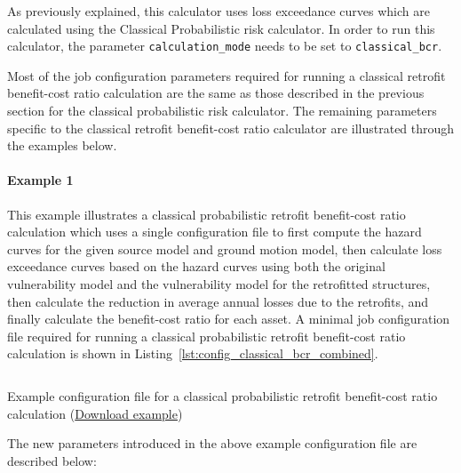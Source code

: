 As previously explained, this calculator uses loss exceedance curves which are
calculated using the Classical Probabilistic risk calculator. In order to run
this calculator, the parameter \Verb+calculation_mode+ needs to be set to
\Verb+classical_bcr+.

Most of the job configuration parameters required for running a classical
retrofit benefit-cost ratio calculation are the same as those described in the
previous section for the classical probabilistic risk calculator. The
remaining parameters specific to the classical retrofit benefit-cost ratio
calculator are illustrated through the examples below.

\paragraph{Example 1}

This example illustrates a classical probabilistic retrofit benefit-cost ratio
calculation which uses a single configuration file to first compute the hazard
curves for the given source model and ground motion model, then calculate loss
exceedance curves based on the hazard curves using both the original
vulnerability model and the vulnerability model for the retrofitted
structures, then calculate the reduction in average annual losses due to the
retrofits, and finally calculate the benefit-cost ratio for each asset. A
minimal job configuration file required for running a classical probabilistic
retrofit benefit-cost ratio calculation is shown in
Listing~\ref{lst:config_classical_bcr_combined}.

\begin{listing}[htbp]
  \inputminted[firstline=1,firstnumber=1,fontsize=\footnotesize,frame=single,linenos,bgcolor=lightgray,label=job.ini]{ini}{oqum/risk/verbatim/config_classical_bcr_combined.ini}
  \caption{Example configuration file for a classical probabilistic retrofit benefit-cost ratio calculation (\href{https://raw.githubusercontent.com/GEMScienceTools/oq-engine-docs/master/oqum/risk/verbatim/config_classical_bcr_combined.ini}{Download example})}
  \label{lst:config_classical_bcr_combined}
\end{listing}

The new parameters introduced in the above example configuration file are
described below:


